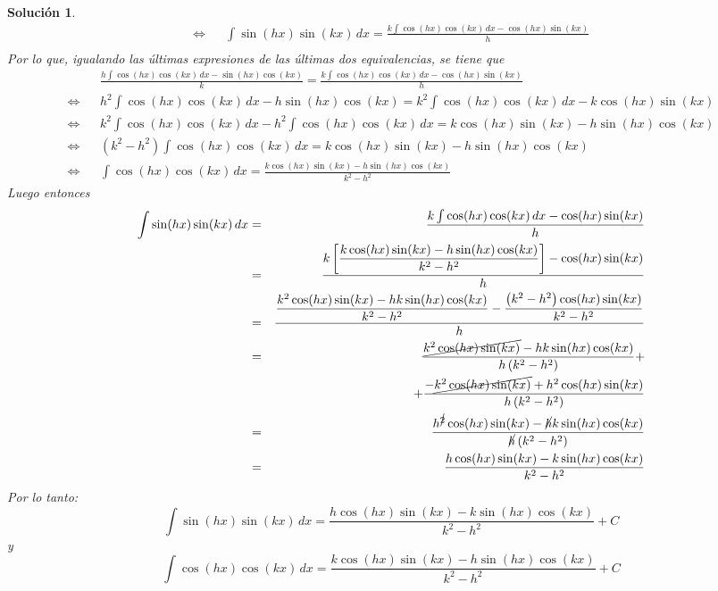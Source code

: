 \documentclass[a4paper,11pt]{article}
\theoremstyle{teoremas}
\theoremstyle{ejemplos}
\theoremstyle{definiciones}
\theoremstyle{lemas}
\newtheorem*{solucion}{Soluci\'on}
\begin{document}
\begin{enumerate}
\begin{solucion}
\begin{eqnarray*}
   \Leftrightarrow & & \int \sin(hx)\sin(kx) \, dx = \frac{k \int \cos(hx)\cos(kx) \, dx - \cos(hx)\sin(kx)}{h} \\
  \end{eqnarray*}
  Por lo que, igualando las \'ultimas expresiones de las \'ultimas dos equivalencias, se tiene que
  \begin{eqnarray*}
   & & \frac{h \int \cos(hx)\cos(kx) \, dx - \sin(hx)\cos(kx)}{k} = \frac{k \int \cos(hx)\cos(kx) \, dx - \cos(hx)\sin(kx)}{h} \\ 
   \Leftrightarrow & & h^2 \int \cos(hx)\cos(kx) \, dx - h\sin(hx)\cos(kx) = k^2 \int \cos(hx)\cos(kx) \, dx - k\cos(hx)\sin(kx) \\ 
   \Leftrightarrow & & k^2 \int \cos(hx)\cos(kx) \, dx - h^2 \int \cos(hx)\cos(kx) \, dx = k\cos(hx)\sin(kx) - h\sin(hx)\cos(kx) \\ 
   \Leftrightarrow & & \left( k^2 - h^2 \right) \int \cos(hx)\cos(kx) \, dx = k\cos(hx)\sin(kx) - h\sin(hx)\cos(kx) \\ 
   \Leftrightarrow & & \int \cos(hx)\cos(kx) \, dx = \frac{ k\cos(hx)\sin(kx) - h\sin(hx)\cos(kx) }{k^2 - h^2}   
  \end{eqnarray*}
  Luego entonces
  \begin{eqnarray*}
   \int \sin(hx)\sin(kx) \, dx & = & \frac{k \int \cos(hx)\cos(kx) \, dx - \cos(hx)\sin(kx)}{h} \\
   & = & \frac{\displaystyle{  k \left[ \frac{ k\cos(hx)\sin(kx) - h\sin(hx)\cos(kx) }{k^2 - h^2} \right] - \cos(hx)\sin(kx)  }}{h} \\ 
   & = & \frac{\displaystyle{ \frac{ k^2\cos(hx)\sin(kx) - hk\sin(hx)\cos(kx) }{k^2 - h^2} - \frac{\left(k^2-h^2 \right)\cos(hx)\sin(kx)}{k^2-h^2}  }}{h} \\ 
   & = & \frac{\cancel{k^2\cos(hx)\sin(kx)} - hk\sin(hx)\cos(kx)}{h\left( k^2 - h^2 \right)} + \\ 
   &   & + \frac{ -\cancel{k^2\cos(hx)\sin(kx)} + h^2\cos(hx)\sin(kx)}{h\left( k^2 - h^2 \right)} \\
   & = & \frac{h^{\cancel{2}}\cos(hx)\sin(kx) - \cancel{h}k\sin(hx)\cos(kx)}{\cancel{h}\left( k^2 - h^2 \right)} \\ 
   & = & \frac{h\cos(hx)\sin(kx) - k\sin(hx)\cos(kx)}{ k^2 - h^2 }
  \end{eqnarray*}
  Por lo tanto:
  \begin{equation}
   \int \sin(hx)\sin(kx) \, dx = \frac{h\cos(hx)\sin(kx) - k\sin(hx)\cos(kx)}{ k^2 - h^2 } + C
  \end{equation}
  y 
  \begin{equation}
   \int \cos(hx)\cos(kx) \, dx = \frac{ k\cos(hx)\sin(kx) - h\sin(hx)\cos(kx) }{k^2 - h^2} + C
  \end{equation}
 \end{solucion}
 

\end{enumerate}
\end{document}
